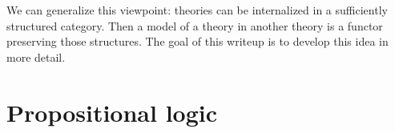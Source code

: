 \documentclass[article,10pt,oneside]{memoir}
\begin{document}
We can generalize this viewpoint: theories can be internalized in a sufficiently structured category.
Then a model of a theory in another theory is a functor preserving those structures.
The goal of this writeup is to develop this idea in more detail.

\section{Propositional logic}
\label{sec:propositional-logic}





\end{document}
